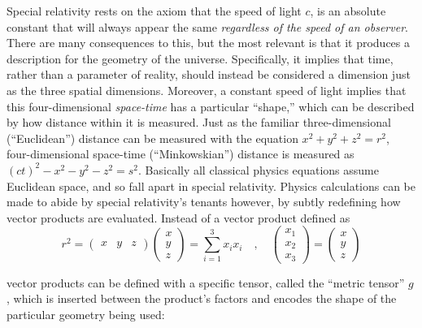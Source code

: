     Special relativity rests on the axiom that the speed of light $c$,
        is an absolute constant that will always appear the same
        \textit{regardless of the speed of an observer}.
    There are many consequences to this, but the most relevant is that
        it produces a description for the geometry of the universe.
    Specifically, it implies that time, rather than a parameter of reality,
        should instead be considered a dimension just as the three spatial dimensions.
    Moreover, a constant speed of light implies that this four-dimensional \textit{space-time} has a particular ``shape,''
        which can be described by how distance within it is measured.
    Just as the familiar three-dimensional (``Euclidean'') distance can be measured with the equation $x^2+y^2+z^2=r^2$,
        four-dimensional space-time (``Minkowskian'') distance is measured as $(ct)^2-x^2-y^2-z^2 = s^2$.
    Basically all classical physics equations assume Euclidean space, and so fall apart in special relativity.
    Physics calculations can be made to abide by special relativity's tenants however,
        by subtly redefining how vector products are evaluated.
    Instead of a vector product defined as
    \begin{equation}
        r^2 = \begin{pmatrix} x & y & z\end{pmatrix} \begin{pmatrix} x \\ y \\ z \end{pmatrix} = \sum\limits_{i=1}^3 x_i x_i
        \quad , \quad \begin{pmatrix}x_1 \\ x_2 \\ x_3 \end{pmatrix} = \begin{pmatrix} x \\ y \\ z \end{pmatrix} 
    \end{equation}

    vector products can be defined with a specific tensor, called the ``metric tensor'' $g$,
        which is inserted between the product's factors and encodes the shape of the particular geometry being used:

